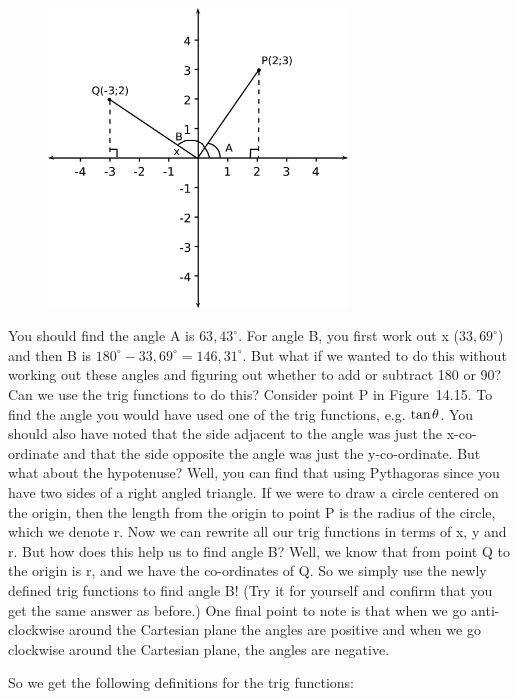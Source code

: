 	\begin{figure}[H] %
    \begin{center}
    \label{m39411*id63458!!!underscore!!!media}\label{m39411*id63458!!!underscore!!!printimage}\includegraphics[width=300px]{col11306.imgs/m39411_trigfunc1.png} %
      \vspace{2pt}
    \vspace{.1in}
    \end{center}
 \end{figure}       \par \label{m39411*eip-9}You should find the angle A is \begin{math}63,{43}^{\circ }\end{math}. For angle B, you first work out x (\begin{math}33,{69}^{\circ }\end{math}) and then B is \begin{math}{180}^{\circ }-33,{69}^{\circ }=146,{31}^{\circ }\end{math}. But what if we wanted to do this without working out these angles and figuring out whether to add or subtract 180 or 90? Can we use the trig functions to do this? Consider point P in Figure~14.15. To find the angle you would have used one of the trig functions, e.g. \begin{math}\mathrm{tan}\phantom{\rule{1pt}{0ex}}\theta \end{math}. You should also have noted that the side adjacent to the angle was just the x-co-ordinate and that the side opposite the angle was just the y-co-ordinate. But what about the hypotenuse? Well, you can find that using Pythagoras since you have two sides of a right angled triangle. If we were to draw a circle centered on the origin, then the length from the origin to point P is the radius of the circle, which we denote r. Now we can rewrite all our trig functions in terms of x, y and r. But how does this help us to find angle B? Well, we know that from point Q to the origin is r, and we have the co-ordinates of Q. So we simply use the newly defined trig functions to find angle B! (Try it for yourself and confirm that you get the same answer as before.) One final point to note is that when we go anti-clockwise around the Cartesian plane the angles are positive and when we go clockwise around the Cartesian plane, the angles are negative. \par \label{m39411*eip-634}So we get the following definitions for the trig functions:
